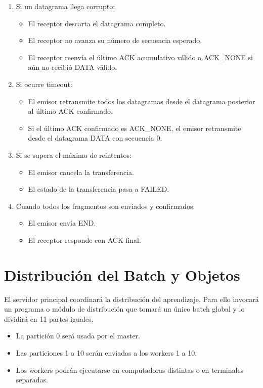 \documentclass[12pt]{article}
\begin{document}
\begin{enumerate}
\item Si un datagrama llega corrupto:
\begin{itemize}
\item El receptor descarta el datagrama completo.
\item El receptor no avanza su número de secuencia esperado.
\item El receptor reenvía el último ACK acumulativo válido o ACK\_NONE si aún no recibió DATA válido.
\end{itemize}

\item Si ocurre timeout:
\begin{itemize}
\item El emisor retransmite todos los datagramas desde el datagrama posterior al último ACK confirmado.
\item Si el último ACK confirmado es ACK\_NONE, el emisor retransmite desde el datagrama DATA con secuencia 0.
\end{itemize}

\item Si se supera el máximo de reintentos:
\begin{itemize}
\item El emisor cancela la transferencia.
\item El estado de la transferencia pasa a FAILED.
\end{itemize}

\item Cuando todos los fragmentos son enviados y confirmados:
\begin{itemize}
\item El emisor envía END.
\item El receptor responde con ACK final.
\end{itemize}

\end{enumerate}

\section{Distribución del Batch y Objetos}

El servidor principal coordinará la distribución del aprendizaje. Para ello invocará un programa o módulo de distribución que tomará un único batch global y lo dividirá en 11 partes iguales.

\begin{itemize}
\item La partición 0 será usada por el master.
\item Las particiones 1 a 10 serán enviadas a los workers 1 a 10.
\item Los workers podrán ejecutarse en computadoras distintas o en terminales separadas.
\end{itemize}
\end{document}
